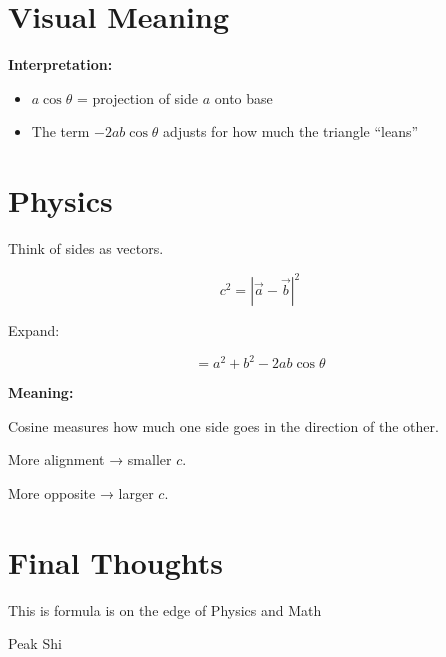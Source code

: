 \documentclass[11pt]{article}
\begin{document}
\section*{\textcolor{main}{Visual Meaning}}

\begin{center}
\end{center}

\textbf{Interpretation:}

\begin{itemize}
\item $a\cos\theta$ = projection of side $a$ onto base
\item The term $-2ab\cos\theta$ adjusts for how much the triangle ``leans''
\end{itemize}

\section*{\textcolor{main}{Physics}}

Think of sides as vectors.

\[
c^2 = |\vec{a} - \vec{b}|^2
\]

Expand:

\[
= a^2 + b^2 - 2ab\cos\theta
\]

\begin{tcolorbox}[colback=soft, colframe=accent]
\textbf{Meaning:}

Cosine measures how much one side goes in the direction of the other.

More alignment → smaller $c$.

More opposite → larger $c$.
\end{tcolorbox}

\section*{\textcolor{main}{Final Thoughts}}

\begin{center}
\textcolor{accent}{This is formula is on the edge of Physics and Math}

\vspace{0.3em}

\textcolor{main}{Peak Shi}
\end{center}
\end{document}
